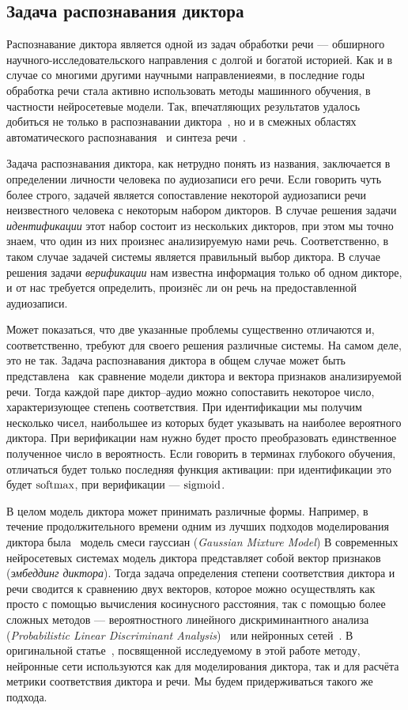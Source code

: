 \subsection{Задача распознавания диктора}

Распознавание диктора является одной из задач обработки речи --- обширного
научного-исследовательского направления с долгой и богатой историей. Как и в
случае со многими другими научными направлениеями, в последние годы обработка
речи стала активно использовать методы машинного обучения, в частности
нейросетевые модели. Так, впечатляющих результатов удалось добиться не только в
распознавании диктора~\cite{xvectorspaper,sincnet}, но и в смежных областях
автоматического распознавания~\cite{wav2vec2} и синтеза речи~\cite{tacotron2}.

Задача распознавания диктора, как нетрудно понять из названия, заключается в
определении личности человека по аудиозаписи его речи. Если говорить чуть
более строго, задачей является сопоставление некоторой аудиозаписи речи
неизвестного человека с некоторым набором дикторов. В случае решения задачи
\emph{идентификации} этот набор состоит из нескольких дикторов, при этом мы
точно знаем, что один из них произнес анализируемую нами речь. Соответственно,
в таком случае задачей системы является правильный выбор диктора. В случае
решения задачи \emph{верификации} нам известна информация только об одном
дикторе, и от нас требуется определить, произнёс ли он речь на предоставленной
аудиозаписи.

Может показаться, что две указанные проблемы существенно отличаются и,
соответственно, требуют для своего решения различные системы. На самом деле,
это не так. Задача распознавания диктора в общем случае может быть
представлена~\cite{sr_chapter} как сравнение модели диктора и вектора признаков
анализируемой речи. Тогда каждой паре диктор--аудио можно сопоставить некоторое
число, характеризующее степень соответствия. При идентификации мы получим
несколько чисел, наибольшее из которых будет указывать на наиболее вероятного
диктора. При верификации нам нужно будет просто преобразовать единственное
полученное число в вероятность. Если говорить в терминах глубокого обучения,
отличаться будет только последняя функция активации: при идентификации это будет
$\operatorname{\text{softmax}}$, при верификации --- $\operatorname{\text{sigmoid}}$.

В целом модель диктора может принимать различные формы. Например, в течение
продолжительного времени одним из лучших подходов моделирования диктора
была~\cite{sr_chapter} модель смеси гауссиан (\textit{Gaussian Mixture Model}) В
современных нейросетевых системах модель диктора представляет собой вектор
признаков (\emph{эмбеддинг диктора}). Тогда задача определения степени
соответствия диктора и речи сводится к сравнению двух векторов, которое можно
осуществлять как просто с помощью вычисления косинусного расстояния, так с
помощью более сложных методов --- вероятностного линейного дискриминантного
анализа (\textit{Probabilistic Linear Discriminant Analysis})~\cite{PLDA} или
нейронных сетей~\cite{Zeng_2022}. В оригинальной статье~\citeisr{}, посвященной
исследуемому в этой работе методу, нейронные сети используются как для
моделирования диктора, так и для расчёта метрики соответствия диктора и речи.
Мы будем придерживаться такого же подхода.

